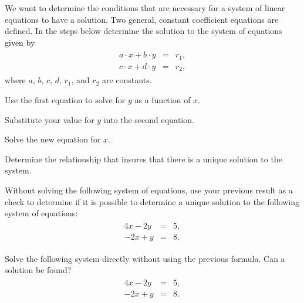 \begin{problem}
\item We want to determine the conditions that are necessary for a system of linear
  equations to have a solution. Two general, constant coefficient equations are defined.
  In the steps below determine the solution to the system of equations given by
\begin{eqnarray*}
  \begin{array}{lcl}
    a \cdot x + b \cdot y & = & r_1, \\
    c \cdot x + d \cdot y & = & r_2,
  \end{array}
\end{eqnarray*}
where $a$, $b$, $c$, $d$, $r_1$, and $r_2$ are constants.
\begin{subproblem}
  \item Use the first equation to solve for $y$ as a function of $x$.
    \vfill
  \item Substitute your value for $y$ into the second equation.
    \vfill
  \item Solve the new equation for $x$.
    \vfill
  \item Determine the relationship that insures that there is a unique solution to the system.
    \vfill
\end{subproblem}

  \clearpage

\item Without solving the following system of equations, use your previous result as a check to determine if it is possible to determine a unique solution to the following system of equations:
\begin{eqnarray*}
  \begin{array}{lcl}
     4x - 2y & = & 5, \\
    -2x + y & = & 8.
  \end{array}
\end{eqnarray*}

  \vspace{4em}

\item Solve the following system directly without using the previous formula. Can a solution be found?
\begin{eqnarray*}
  \begin{array}{lcl}
     4x - 2y & = & 5, \\
    -2x + y & = & 8.
  \end{array}
\end{eqnarray*}


\end{problem}

